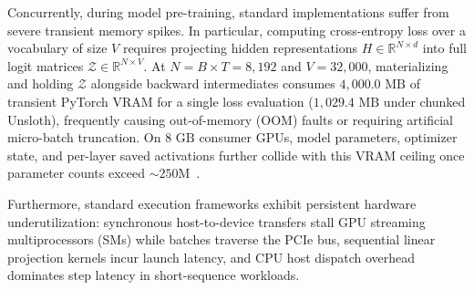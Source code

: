 \documentclass[10pt,twocolumn,letterpaper]{article}
\begin{document}
Concurrently, during model pre-training, standard implementations suffer from severe transient memory spikes. In particular, computing cross-entropy loss over a vocabulary of size $V$ requires projecting hidden representations $H \in \mathbb{R}^{N \times d}$ into full logit matrices $\mathcal{Z} \in \mathbb{R}^{N \times V}$. At $N = B \times T = 8,192$ and $V = 32,000$, materializing and holding $\mathcal{Z}$ alongside backward intermediates consumes $4,000.0\text{ MB}$ of transient PyTorch VRAM for a single loss evaluation ($1,029.4\text{ MB}$ under chunked Unsloth), frequently causing out-of-memory (OOM) faults or requiring artificial micro-batch truncation. On $8\text{ GB}$ consumer GPUs, model parameters, optimizer state, and per-layer saved activations further collide with this VRAM ceiling once parameter counts exceed $\sim 250\text{M}$~\cite{ren2021zerooffload,chen2016training}.

Furthermore, standard execution frameworks exhibit persistent hardware underutilization: synchronous host-to-device transfers stall GPU streaming multiprocessors (SMs) while batches traverse the PCIe bus, sequential linear projection kernels incur launch latency, and CPU host dispatch overhead dominates step latency in short-sequence workloads.
\end{document}
